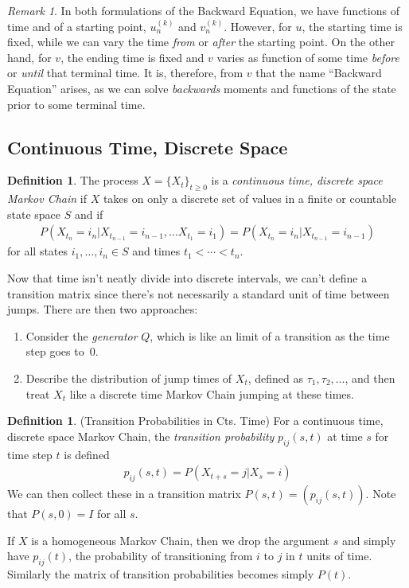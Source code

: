 \documentclass[12pt]{article}
\theoremstyle{plain}
\theoremstyle{definition}
\newtheorem{defn}[thm]{Definition}
\theoremstyle{remark}
\newtheorem*{rmk}{Remark}
\begin{document}
\begin{rmk}
In both formulations of the Backward Equation, we have functions of time
and of a starting point, $u^{(k)}_n$ and $v^{(k)}_n$. However, for $u$,
the starting time is fixed, while we can vary the time \emph{from} or
\emph{after} the starting point. On the other hand, for $v$, the ending
time is fixed and $v$ varies as function of some time \emph{before} or
\emph{until} that terminal time. It is, therefore, from $v$ that the
name ``Backward Equation'' arises, as we can solve \emph{backwards}
moments and functions of the state prior to some terminal time.
\end{rmk}

\subsection{Continuous Time, Discrete Space}

\begin{defn}
The process $X=\{X_t\}_{t\geq 0}$ is a \emph{continuous time, discrete
space Markov Chain} if $X$ takes on only a discrete set of values in a finite or countable state space $S$ and if
\begin{align*}
  P(X_{t_n} = i_{n} | X_{t_{n-1}} = i_{n-1}, \ldots X_{t_1} = i_{1})
  =
  P(X_{t_n} = i_{n} | X_{t_{n-1}} = i_{n-1})
\end{align*}
for all states $i_1,\ldots,i_n\in S$ and times $t_1<\cdots<t_n$.
\end{defn}

Now that time isn't neatly divide into discrete intervals, we can't
define a transition matrix since there's not necessarily a standard unit
of time between jumps. There are then two approaches:
\begin{enumerate}
  \item Consider the \emph{generator} $Q$, which is like an limit of a
    transition as the time step goes to~0.
  \item Describe the distribution of jump times of $X_t$, defined as
    $\tau_1, \tau_2,\ldots$, and then treat $X_t$ like a discrete time
    Markov Chain jumping at these times.
\end{enumerate}

\begin{defn}{(Transition Probabilities in Cts. Time)}
For a continuous time, discrete space Markov Chain, the \emph{transition
probability} $p_{ij}(s,t)$ at time $s$ for time step $t$ is defined
\begin{align*}
  p_{ij}(s,t) = P(X_{t+s}=j|X_s=i)
\end{align*}
We can then collect these in a transition matrix $P(s,t) =
(p_{ij}(s,t))$. Note that $P(s,0) = I$ for all $s$.

If $X$ is a homogeneous Markov Chain, then we drop the argument $s$ and
simply have $p_{ij}(t)$, the probability of transitioning from $i$ to
$j$ in $t$ units of time. Similarly the matrix of transition
probabilities becomes simply $P(t)$.
\end{defn}
\end{document}
